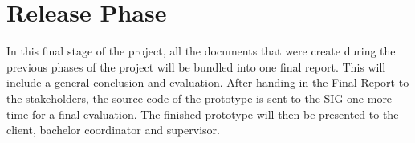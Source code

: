 \section{Release Phase}
In this final stage of the project, all the documents that were create during the previous phases of the project will be bundled into one final report. This will include a general conclusion and evaluation. After handing in the Final Report to the stakeholders, the source code of the prototype is sent to the SIG one more time for a final evaluation. The finished prototype will then be presented to the client, bachelor coordinator and supervisor. 